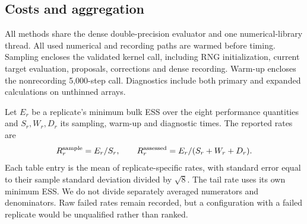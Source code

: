 \documentclass[11pt]{article}
\theoremstyle{definition}\newtheorem{definition}[theorem]{Definition}
\theoremstyle{remark}\newtheorem{remark}[theorem]{Remark}
\numberwithin{equation}{section}
\newcommand{\1}{\mathbf 1}
\begin{document}
\subsection{Costs and aggregation}
All methods share the dense double-precision evaluator and one numerical-library thread. All used numerical and recording paths are warmed before timing. Sampling encloses the validated kernel call, including RNG initialization, current target evaluation, proposals, corrections and dense recording. Warm-up encloses the nonrecording 5,000-step call. Diagnostics include both primary and expanded calculations on unthinned arrays.

Let $E_r$ be a replicate's minimum bulk ESS over the eight performance quantities and $S_r,W_r,D_r$ its sampling, warm-up and diagnostic times. The reported rates are
\[
 R_r^{\rm sample}=E_r/S_r,\qquad R_r^{\rm assessed}=E_r/(S_r+W_r+D_r).
\]
Each table entry is the mean of replicate-specific rates, with standard error equal to their sample standard deviation divided by $\sqrt8$. The tail rate uses its own minimum ESS. We do not divide separately averaged numerators and denominators. Raw failed rates remain recorded, but a configuration with a failed replicate would be unqualified rather than ranked.
\end{document}
